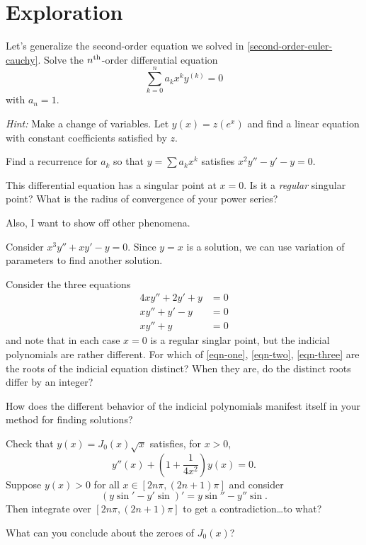\documentclass{homework}
\begin{document}
\section{Exploration}

\begin{problem}
  Let's generalize the second-order equation we solved in
  \ref{second-order-euler-cauchy}.  Solve the
  $n^{\mbox{\scriptsize th}}$-order differential equation
  \[
    \sum_{k=0}^n a_k x^k y^{(k)} = 0
  \]
  with $a_n = 1$.

  \textit{Hint:} Make a change of variables.  Let $y(x) = z(e^x)$ and
  find a linear equation with constant coefficients satisfied by $z$.
\end{problem}

\begin{problem}
  Find a recurrence for $a_k$ so that $y = \sum a_k x^k$ satisfies \(x^2 y'' - y' - y = 0\).

  This differential equation has a singular point at $x = 0$.  Is it a
  \textit{regular} singular point?  What is the radius of convergence
  of your power series?
\end{problem}

\begin{solution}
  Also, I want to show off other phenomena.

  Consider $x^3 y'' + x y' - y = 0$.  Since $y = x$ is a solution, we
  can use variation of parameters to find another solution.
\end{solution}

\begin{problem}
  Consider the three equations
  \begin{align}
    4xy'' + 2y' + y &= 0 \label{eqn-one}\\
    x y'' + y' - y &= 0 \label{eqn-two}\\
    x y'' + y &= 0 \label{eqn-three}
  \end{align}
  and note that in each case $x=0$ is a regular singlar point, but the
  indicial polynomials are rather different.  For which of
  \eqref{eqn-one}, \eqref{eqn-two}, \eqref{eqn-three} are the roots of
  the indicial equation distinct?  When they are, do the distinct
  roots differ by an integer?

  How does the different behavior of the indicial polynomials manifest
  itself in your method for finding solutions?
\end{problem}


\begin{problem}\label{finding-zeroes-of-bessel}Check that $y(x) = J_0(x) \sqrt{x}$ satisfies, for $x > 0$,
  \[
    y''(x) + \left( 1 + \frac{1}{4x^2} \right) y(x) = 0.
  \]
  Suppose $y(x) > 0$ for all $x \in [2 n \pi, (2n+1) \pi]$ and consider
  \[
    \left( y \sin' - y' \sin \right)' = y \sin '' - y'' \sin. %
  \]
  Then integrate over $[2n \pi, (2n+1) \pi]$ to get a
  contradiction\ldots to what?

  What can you conclude about the zeroes of $J_0(x)$?
\end{problem}
\end{document}
